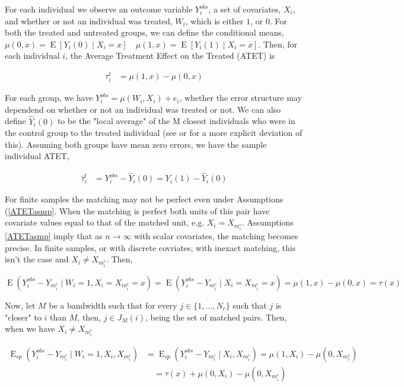 \documentclass{article}
\DeclareMathOperator{\E}{E}
\begin{document}
For each individual we observe an outcome variable $Y_{i}^{obs}$, a set of covariates, $X_{i}$, and whether or not an individual was treated, $W_{i}$, which is either $1$, or $0$. For both the treated and untreated groups, we can define the conditional means, $\mu(0,x) = \E[Y_{i}(0) \mid X_{i} = x]\quad \mu(1,x) = \E[Y_{i}(1) \mid X_{i} = x]$. Then, for each individual $i$, the Average Treatment Effect on the Treated (ATET) is

\begin{align*} \tau_{i}^{t} &= \mu(1,x) - \mu(0,x) \end{align*}

For each group, we have $Y_{i}^{obs} = \mu(W_{i},X_{i})+e_{i}$, whether the error structure may dependend on whether or not an individual was treated or not. We can also define $\hat Y_{i}(0)$ to be the "local average" of the M closest individuals who were in the control group to the treated individual (see \cite{InR:15} or \cite{AnI:06} for a more explicit deviation of this). Assuming both groups have mean zero errors, we have the sample individual ATET,

\begin{align*} \hat \tau_{i}^{t} &= Y_{i}^{obs}-\hat Y_{i}(0) = Y_{i}(1)-\hat Y_{i}(0) \end{align*}

For finite samples the matching may not be perfect even under Assumptions (\ref{ATETasmp}. When the matching is perfect both units of this pair have covariate values equal to that of the matched unit, e.g. $X_{i} = X_{m_{i}^{c}}$. Assumptions \ref{ATETasmp} imply that as $n \to \infty$ with scalar covariates, the matching becomes precise. In finite samples, or with discrete covriates, with inexact matching, this isn't the case and $X_{i} \neq X_{m_{i}^{c}}$. Then,

$$\E(Y_{i}^{obs}-Y_{m_{i}^{c}} \mid W_{i} = 1, X_{i} = X_{m_{i}^{c}} = x) = \E(Y_{i}^{obs}-Y_{m_{i}^{c}} \mid X_{i} = X_{m_{i}^{c}} = x) = \mu(1,x) - \mu(0,x) = \tau(x)$$

Now, let $M$ be a bandwidth such that for every $j \in \{1,...,N_{c}\}$ such that $j$ is "closer" to $i$ than $M$, then, $j \in J_{M}(i)$, being the set of matched pairs. Then, when we have $X_{i} \neq X_{m_{i}^{c}}$

\begin{align*} \E_{sp}(Y_{i}^{obs}-Y_{m_{i}^{c}} \mid W_{i} = 1, X_{i}, X_{m_{i}^{c}}) &= \E_{sp}(Y_{i}^{obs}-Y_{m_{i}^{c}} \mid X_{i}, X_{m_{i}^{c}}) = \mu(1,X_{i}) - \mu(0,X_{m_{i}^{c}}) \\
&\quad= \tau(x)+ \mu(0,X_{i}) -\mu(0,X_{m_{i}^{c}}) \end{align*}
\end{document}
